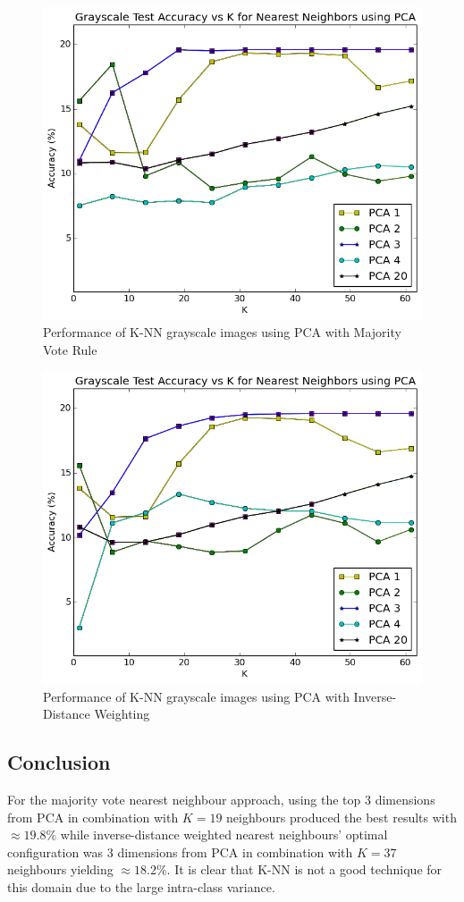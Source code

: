 \documentclass{article} %
\begin{document}
\begin{figure}
\centering
	\includegraphics[width=0.8\linewidth]{./plots/knn/majorityvote}
    	\caption{Performance of K-NN grayscale images using PCA with Majority Vote Rule}
	\label{fig:knn_vote}
\end{figure}

\begin{figure}
\centering
	\includegraphics[width=0.8\linewidth]{./plots/knn/weighted}
    	\caption{Performance of K-NN grayscale images using PCA with Inverse-Distance Weighting}
	\label{fig:knn_weighted}
\end{figure}

\subsection{Conclusion}
For the majority vote nearest neighbour approach, using the top 3 dimensions from PCA in combination with $K=19$ neighbours produced the best results with $\approx 19.8\%$ while inverse-distance weighted nearest neighbours' optimal configuration was 3 dimensions from PCA in combination with $K=37$ neighbours yielding $\approx 18.2\%$. It is clear that K-NN is not a good technique for this domain due to the large intra-class variance.
\end{document}
